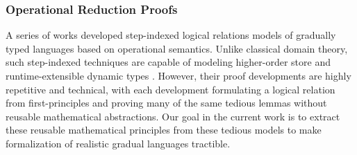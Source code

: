 \subsubsection{Operational Reduction Proofs}

A series of works \cite{new-ahmed2018, new-licata-ahmed2019, new-jamner-ahmed19}
developed step-indexed logical relations models of gradually typed
languages based on operational semantics. Unlike classical domain
theory, such step-indexed techniques are capable of modeling
higher-order store and runtime-extensible dynamic types
\cite{amalsthesis,nonpmetricparamorsomething,new-jamner-ahmed19}. However,
their proof developments are highly repetitive and technical, with
each development formulating a logical relation from first-principles
and proving many of the same tedious lemmas without reusable
mathematical abstractions. Our goal in the current work is to extract
these reusable mathematical principles from these tedious models to
make formalization of realistic gradual languages tractible.


